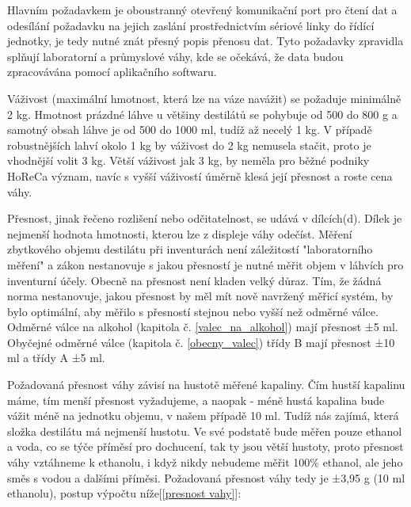 


Hlavním požadavkem je oboustranný otevřený komunikační port pro čtení dat a odesílání požadavku na jejich zaslání prostřednictvím sériové linky do řídící jednotky, je tedy nutné znát přesný popis přenosu dat. Tyto požadavky zpravidla splňují laboratorní a průmyslové váhy, kde se očekává, že data budou zpracovávána pomocí aplikačního softwaru.

Váživost (maximální hmotnost, která lze na váze navážit) se požaduje minimálně 2 kg. Hmotnost prázdné láhve u většiny destilátů se pohybuje od 500 do 800 g a samotný obsah láhve je od 500 do 1000 ml, tudíž až necelý 1 kg. V případě robustnějších lahví okolo 1 kg by váživost do 2 kg nemusela stačit, proto je vhodnější volit 3 kg. Větší váživost jak 3 kg, by neměla pro běžné podniky HoReCa význam, navíc s vyšší váživostí úměrně klesá její přesnost a roste cena váhy.

Přesnost, jinak řečeno rozlišení nebo odčitatelnost, se udává v dílcích(d). Dílek je nejmenší hodnota hmotnosti, kterou lze z displeje váhy odečíst.\cite{vazivost} Měření zbytkového objemu destilátu při inventurách není záležitostí "laboratorního měření" a zákon nestanovuje s jakou přesností je nutné měřit objem v láhvích pro inventurní účely. Obecně na 
přesnost není kladen velký důraz. Tím, že žádná norma nestanovuje, jakou přesnost by měl mít nově navržený měřicí systém, by bylo optimální, aby měřilo s přesností stejnou nebo vyšší než odměrné válce. Odměrné válce na alkohol
(kapitola č. \ref{valec_na_alkohol}) mají přesnost ±5 ml. Obyčejné odměrné válce (kapitola č. \ref{obecny_valec}) třídy B mají přesnost ±10 ml a třídy A ±5 ml.

Požadovaná přesnost váhy závisí na hustotě měřené kapaliny.  Čím hustší kapalinu máme, tím menší přesnost vyžadujeme, a naopak - méně hustá kapalina bude vážit méně na jednotku objemu, v našem případě 10 ml. Tudíž nás zajímá, která složka destilátu má nejmenší hustotu. Ve své podstatě bude měřen pouze ethanol a voda, co se týče příměsí pro dochucení, tak ty jsou větší hustoty, proto přesnost váhy vztáhneme k ethanolu, i když nikdy nebudeme měřit 100\% ethanol, ale jeho směs s vodou a dalšími příměsi. Požadovaná přesnost váhy tedy je ±3,95 g (10 ml ethanolu), postup výpočtu níže[\ref{presnost vahy}]:\\

